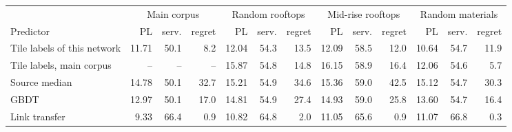 \begin{tabular}{lrrrrrrrrrrrr}
\toprule
& \multicolumn{3}{c}{Main corpus} & \multicolumn{3}{c}{Random rooftops} & \multicolumn{3}{c}{Mid-rise rooftops} & \multicolumn{3}{c}{Random materials} \\
\cmidrule(lr){2-4}\cmidrule(lr){5-7}\cmidrule(lr){8-10}\cmidrule(lr){11-13}
Predictor & PL & serv. & regret & PL & serv. & regret & PL & serv. & regret & PL & serv. & regret \\
\midrule
Tile labels of this network & 11.71 & 50.1 & 8.2 & 12.04 & 54.3 & 13.5 & 12.09 & 58.5 & 12.0 & 10.64 & 54.7 & 11.9 \\
Tile labels, main corpus & -- & -- & -- & 15.87 & 54.8 & 14.8 & 16.15 & 58.9 & 16.4 & 12.06 & 54.6 & 5.7 \\
Source median & 14.78 & 50.1 & 32.7 & 15.21 & 54.9 & 34.6 & 15.36 & 59.0 & 42.5 & 15.12 & 54.7 & 30.3 \\
GBDT & 12.97 & 50.1 & 17.0 & 14.81 & 54.9 & 27.4 & 14.93 & 59.0 & 25.8 & 13.60 & 54.7 & 16.4 \\
Link transfer & 9.33 & 66.4 & 0.9 & 10.82 & 64.8 & 2.0 & 11.05 & 65.6 & 0.9 & 11.07 & 66.8 & 0.3 \\
\bottomrule
\end{tabular}
